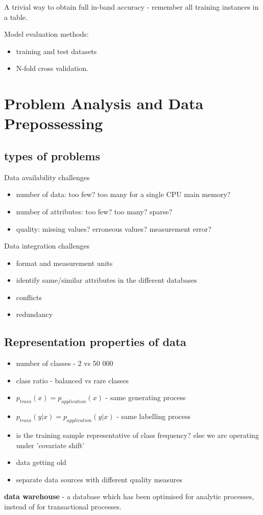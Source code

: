\documentclass{article}
\newcommand{\para}[0]{\par\vspace{0.2cm}\noindent}
\newcommand{\define}[2]{\textbf{#1} - {#2}.  \para}
\begin{document}
A trivial way to obtain full in-band accuracy - remember all training instances in a table.  \\
\par
Model evaluation methods:
\begin{itemize}
    \item{training and test datasets}
    \item{N-fold cross validation.}
\end{itemize}


\section{Problem Analysis and Data Prepossessing}
\subsection{types of problems}
Data availability challenges
\begin{itemize}
    \item{number of data: too few? too many for a single CPU main memory?}
    \item{number of attributes: too few? too many? sparse?}
    \item{quality: missing values? erroneous values? measurement error?}
\end{itemize}


Data integration challenges
\begin{itemize}
    \item{format and measurement units}
    \item{identify same/similar attributes in the different databases}
    \item{conflicts}
    \item{redundancy}
\end{itemize}


\subsection{Representation properties of data}
\begin{itemize}
    \item{number of classes - 2 vs 50 000}
    \item{class ratio - balanced vs rare classes}
    \item{$p_{train}(x) = p_{application}(x)$ - same generating process}
    \item{$p_{train}(y|x) = p_{application}(y|x)$ - same labelling process}
    \item{is the training sample representative of class frequency? else we are operating under 'covariate shift'}
    \item{data getting old}
    \item{separate data sources with different quality measures}
\end{itemize}
\para
\define{data warehouse}
           {a database which has been optimised for analytic processes, instead of for transactional processes}
\end{document}
